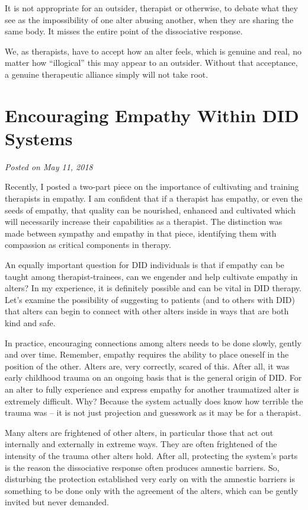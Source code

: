 \documentclass[]{book}
\begin{document}
It is not appropriate for an outsider, therapist or otherwise, to debate what they see as the impossibility of one alter abusing another, when they are sharing the same body. It misses the entire point of the dissociative response.

We, as therapists, have to accept how an alter feels, which is genuine and real, no matter how ``illogical'' this may appear to an outsider. Without that acceptance, a genuine therapeutic alliance simply will not take root.

\hypertarget{encouraging-empathy-within-did-systems}{%
\section{Encouraging Empathy Within DID Systems}\label{encouraging-empathy-within-did-systems}}

\emph{Posted on May 11, 2018}

Recently, I posted a two-part piece on the importance of cultivating and training therapists in empathy. I am confident that if a therapist has empathy, or even the seeds of empathy, that quality can be nourished, enhanced and cultivated which will necessarily increase their capabilities as a therapist. The distinction was made between sympathy and empathy in that piece, identifying them with compassion as critical components in therapy.

An equally important question for DID individuals is that if empathy can be taught among therapist-trainees, can we engender and help cultivate empathy in alters? In my experience, it is definitely possible and can be vital in DID therapy. Let's examine the possibility of suggesting to patients (and to others with DID) that alters can begin to connect with other alters inside in ways that are both kind and safe.

In practice, encouraging connections among alters needs to be done slowly, gently and over time. Remember, empathy requires the ability to place oneself in the position of the other. Alters are, very correctly, scared of this. After all, it was early childhood trauma on an ongoing basis that is the general origin of DID. For an alter to fully experience and express empathy for another traumatized alter is extremely difficult. Why? Because the system actually does know how terrible the trauma was -- it is not just projection and guesswork as it may be for a therapist.

Many alters are frightened of other alters, in particular those that act out internally and externally in extreme ways. They are often frightened of the intensity of the trauma other alters hold. After all, protecting the system's parts is the reason the dissociative response often produces amnestic barriers. So, disturbing the protection established very early on with the amnestic barriers is something to be done only with the agreement of the alters, which can be gently invited but never demanded.
\end{document}
